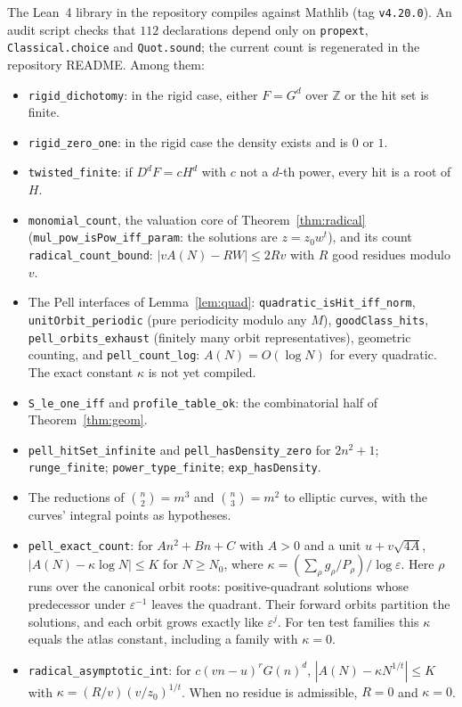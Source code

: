 \documentclass[11pt]{amsart}
\theoremstyle{definition}
\theoremstyle{remark}
\newcommand{\Z}{\mathbb{Z}}
\newcommand{\lean}[1]{\texttt{#1}}
\begin{document}
The Lean~4 library in the repository compiles against Mathlib (tag \texttt{v4.20.0}). An audit script checks that $112$ declarations depend only on \texttt{propext}, \texttt{Classical.choice} and \texttt{Quot.sound}; the current count is regenerated in the repository README. Among them:
\begin{itemize}
\item \lean{rigid\_dichotomy}: in the rigid case, either $F=G^d$ over $\Z$ or the hit set is finite.
\item \lean{rigid\_zero\_one}: in the rigid case the density exists and is $0$ or $1$.
\item \lean{twisted\_finite}: if $D^dF=cH^d$ with $c$ not a $d$-th power, every hit is a root of $H$.
\item \lean{monomial\_count}, the valuation core of Theorem~\ref{thm:radical} (\lean{mul\_pow\_isPow\_iff\_param}: the solutions are $z=z_0w^t$), and its count \lean{radical\_count\_bound}: $|vA(N)-RW|\le2Rv$ with $R$ good residues modulo $v$.
\item The Pell interfaces of Lemma~\ref{lem:quad}: \lean{quadratic\_isHit\_iff\_norm}, \lean{unitOrbit\_periodic} (pure periodicity modulo any $M$), \lean{goodClass\_hits}, \lean{pell\_orbits\_exhaust} (finitely many orbit representatives), geometric counting, and \lean{pell\_count\_log}: $A(N)=O(\log N)$ for every quadratic. The exact constant $\kappa$ is not yet compiled.
\item \lean{S\_le\_one\_iff} and \lean{profile\_table\_ok}: the combinatorial half of Theorem~\ref{thm:geom}.
\item \lean{pell\_hitSet\_infinite} and \lean{pell\_hasDensity\_zero} for $2n^2+1$; \lean{runge\_finite}; \lean{power\_type\_finite}; \lean{exp\_hasDensity}.
\item The reductions of $\binom n2=m^3$ and $\binom n3=m^2$ to elliptic curves, with the curves' integral points as hypotheses.
\item \lean{pell\_exact\_count}: for $An^2+Bn+C$ with $A>0$ and a unit $u+v\sqrt{4A}$, $|A(N)-\kappa\log N|\le K$ for $N\ge N_0$, where $\kappa=(\sum_\rho g_\rho/P_\rho)/\log\varepsilon$. Here $\rho$ runs over the canonical orbit roots: positive-quadrant solutions whose predecessor under $\varepsilon^{-1}$ leaves the quadrant. Their forward orbits partition the solutions, and each orbit grows exactly like $\varepsilon^j$. For ten test families this $\kappa$ equals the atlas constant, including a family with $\kappa=0$.
\item \lean{radical\_asymptotic\_int}: for $c(vn-u)^rG(n)^d$, $|A(N)-\kappa N^{1/t}|\le K$ with $\kappa=(R/v)(v/z_0)^{1/t}$. When no residue is admissible, $R=0$ and $\kappa=0$.

\end{itemize}
\end{document}
